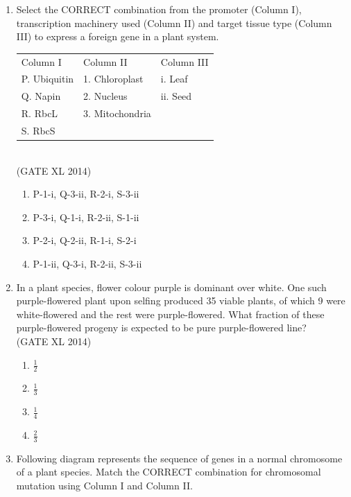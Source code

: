 \documentclass[journal,12pt,onecolumn]{IEEEtran}
\theoremstyle{remark}
\begin{document}
\begin{enumerate}
    \item Select the CORRECT combination from the promoter (Column I), transcription machinery used (Column II) and target tissue type (Column III) to express a foreign gene in a plant system.  

    \begin{tabular}{lll}
    Column I & Column II & Column III \\
    P. Ubiquitin & 1. Chloroplast & i. Leaf \\
    Q. Napin & 2. Nucleus & ii. Seed \\
    R. RbcL & 3. Mitochondria & \\
    S. RbcS & & \\
    \end{tabular}\\
    \hfill (GATE XL 2014)
    \begin{multicols}{2}
    \begin{enumerate}
        \item P-1-i, Q-3-ii, R-2-i, S-3-ii  
        \item P-3-i, Q-1-i, R-2-ii, S-1-ii  
        \item P-2-i, Q-2-ii, R-1-i, S-2-i  
        \item P-1-ii, Q-3-i, R-2-ii, S-3-ii  
    \end{enumerate}
    \end{multicols}

    \item In a plant species, flower colour purple is dominant over white. One such purple-flowered plant upon selfing produced 35 viable plants, of which 9 were white-flowered and the rest were purple-flowered. What fraction of these purple-flowered progeny is expected to be pure purple-flowered line?  \\
    \hfill (GATE XL 2014)
    \begin{multicols}{2}
    \begin{enumerate}
        \item $\tfrac{1}{2}$  
        \item $\tfrac{1}{3}$  
        \item $\tfrac{1}{4}$  
        \item $\tfrac{2}{3}$  
    \end{enumerate}
    \end{multicols}


    \item Following diagram represents the sequence of genes in a normal chromosome of a plant species. Match the CORRECT combination for chromosomal mutation using Column I and Column II.  


\end{enumerate}
\end{document}
